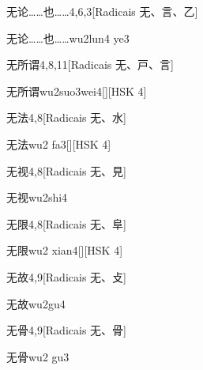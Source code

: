\begin{entry}{无论……也……}{4,6,3}[Radicais ⽆、⾔、⼄]
  \begin{phonetics}{无论……也……}{wu2lun4 ye3}
  \end{phonetics}
\end{entry}

\begin{entry}{无所谓}{4,8,11}[Radicais ⽆、⼾、⾔]
  \begin{phonetics}{无所谓}{wu2suo3wei4}[][HSK 4]
  \end{phonetics}
\end{entry}

\begin{entry}{无法}{4,8}[Radicais ⽆、⽔]
  \begin{phonetics}{无法}{wu2 fa3}[][HSK 4]
  \end{phonetics}
\end{entry}

\begin{entry}{无视}{4,8}[Radicais ⽆、⾒]
  \begin{phonetics}{无视}{wu2shi4}
  \end{phonetics}
\end{entry}

\begin{entry}{无限}{4,8}[Radicais ⽆、⾩]
  \begin{phonetics}{无限}{wu2 xian4}[][HSK 4]
  \end{phonetics}
\end{entry}

\begin{entry}{无故}{4,9}[Radicais ⽆、⽁]
  \begin{phonetics}{无故}{wu2gu4}
  \end{phonetics}
\end{entry}

\begin{entry}{无骨}{4,9}[Radicais ⽆、⾻]
  \begin{phonetics}{无骨}{wu2 gu3}
  \end{phonetics}
\end{entry}

